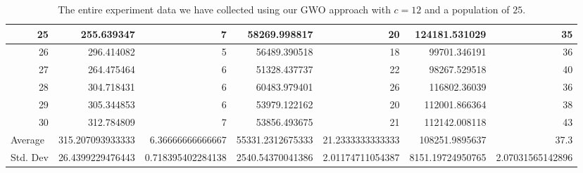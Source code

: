 \begin{table}
\begin{adjustwidth}{}{}
{{\begin{tabular}{|r|r|r|r|r|r|r|}
\hline
25                                         & 255.639347                   & 7                                     & 58269.998817                   & 20                                    & 124181.531029                & 35                                     \\ 
\hline
26                                         & 296.414082                   & 5                                     & 56489.390518                   & 18                                    & 99701.346191                 & 36                                     \\ 
\hline
27                                         & 264.475464                   & 6                                     & 51328.437737                   & 22                                    & 98267.529518                 & 40                                     \\ 
\hline
28                                         & 304.718431                   & 6                                     & 60483.979401                   & 26                                    & 116802.36039                 & 36                                     \\ 
\hline
29                                         & 305.344853                   & 6                                     & 53979.122162                   & 20                                    & 112001.866364                & 38                                     \\ 
\hline
30                                         & 312.784809                   & 7                                     & 53856.493675                   & 21                                    & 112142.008118                & 43                                     \\ 
\hline
\multicolumn{1}{|l|}{Average}              & 315.207093933333             & 6.36666666666667                      & 55331.2312675333               & 21.2333333333333                      & 108251.9895637               & 37.3                                   \\ 
\hline
\multicolumn{1}{|l|}{Std. Dev}             & 26.4399229476443             & 0.718395402284138                     & 2540.54370041386               & 2.01174711054387                      & 8151.19724950765             & 2.07031565142896                       \\
\hline
\end{tabular}}}
\end{adjustwidth}
\caption{The entire experiment data we have collected using our GWO approach with $c = 12$ and a population of $25$.}
\label{full-data-gwo-c12-p25}
\end{table}

